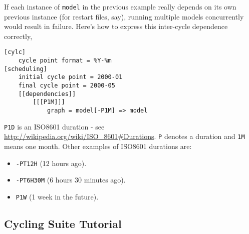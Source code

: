 If each instance of \lstinline=model= in the previous example really depends
on its own previous instance (for restart files, say), running multiple
models concurrently would result in failure.  Here's how to express this
inter-cycle dependence correctly,

\begin{lstlisting}[language=suiterc]
[cylc]
    cycle point format = %Y-%m
[scheduling]
    initial cycle point = 2000-01
    final cycle point = 2000-05
    [[dependencies]]
        [[[P1M]]]
            graph = model[-P1M] => model
\end{lstlisting}

\lstinline=P1D= is an ISO8601 duration - see
    \url{http://wikipedia.org/wiki/ISO_8601#Durations}. \lstinline=P= denotes a
    duration and \lstinline=1M= means one month. Other examples of ISO8601
    durations are:
\begin{itemize}
    \item \lstinline{-PT12H} (12 hours ago).
    \item \lstinline{-PT6H30M} (6 hours 30 minutes ago).
    \item \lstinline{P1W} (1 week in the future).
\end{itemize}

\subsection{Cycling Suite Tutorial}


